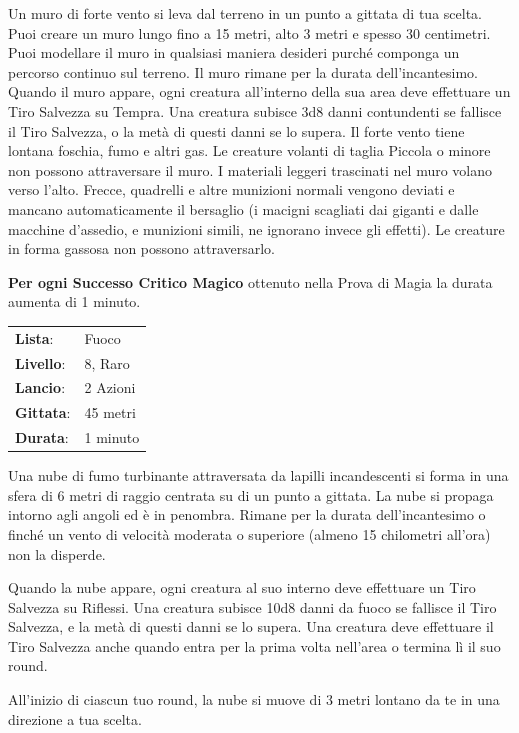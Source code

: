 \begin{multicols}{2}
Un muro di forte vento si leva dal terreno in un punto a gittata di tua scelta. Puoi creare un muro lungo fino a 15 metri, alto 3 metri e spesso 30 centimetri. Puoi modellare il muro in qualsiasi maniera desideri purché componga un percorso continuo sul terreno. Il muro rimane per la durata dell'incantesimo. Quando il muro appare, ogni creatura all'interno della sua area deve effettuare un Tiro Salvezza su Tempra. Una creatura subisce 3d8 danni contundenti se fallisce il Tiro Salvezza, o la metà di questi danni se lo supera. Il forte vento tiene lontana foschia, fumo e altri gas. Le creature volanti di taglia Piccola o minore non possono attraversare il muro. I materiali leggeri trascinati nel muro volano verso l'alto. Frecce, quadrelli e altre munizioni normali vengono deviati e mancano automaticamente il bersaglio (i macigni scagliati dai giganti e dalle macchine d'assedio, e munizioni simili, ne ignorano invece gli effetti). Le creature in forma gassosa non possono attraversarlo.

\textbf{Per ogni Successo Critico Magico} ottenuto nella Prova di Magia la durata aumenta di 1 minuto.

\noindent\begin{tabularx}{\linewidth}{p{1.3cm}X}
	\rowcolor{gray!20}\textbf{Lista}: & Fuoco \\
	\textbf{Livello}: & 8, Raro \\
	\rowcolor{gray!20}\textbf{Lancio}: & 2 Azioni \\
	\textbf{Gittata}: & 45 metri \\
	\rowcolor{gray!20}\textbf{Durata}: & 1 minuto \\
\end{tabularx}\smallskip

Una nube di fumo turbinante attraversata da lapilli incandescenti si forma in una sfera di 6 metri di raggio centrata su di un punto a gittata. La nube si propaga intorno agli angoli ed è in penombra. Rimane per la durata dell'incantesimo o finché un vento di velocità moderata o superiore (almeno 15 chilometri all'ora) non la disperde.

Quando la nube appare, ogni creatura al suo interno deve effettuare un Tiro Salvezza su Riflessi. Una creatura subisce 10d8 danni da fuoco se fallisce il Tiro Salvezza, e la metà di questi danni se lo supera. Una creatura deve effettuare il Tiro Salvezza anche quando entra per la prima volta nell'area o termina lì il suo round.

All'inizio di ciascun tuo round, la nube si muove di 3 metri lontano da te in una direzione a tua scelta.


\end{multicols}
